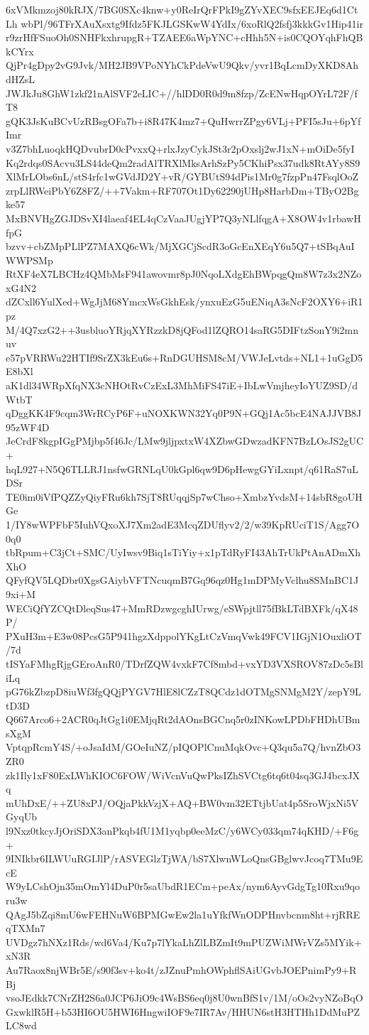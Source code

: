 6xVMkmzoj80kRJX/7BG0SXc4knw+y0ReIrQrFPkI9gZYvXEC9sfxEEJEq6d1CtLh
wbPl/96TFrXAuXsxtg9Ifdz5FKJLGSKwW4YdIx/6xoRlQ2fsfj3kkkGv1Hip41ir
r9zrHfFSuoOh0SNHFkxhrupgR+TZAEE6aWpYNC+cHhh5N+is0CQOYqhFhQBkCYrx
QjPr4gDpy2vG9Jvk/MH2JB9VPoNYhCkPdeVwU9Qkv/yvr1BqLcmDyXKD8AhdHZsL
JWJkJu8GhW1zkf21nAlSVF2eLIC+//hlDD0R0d9m8fzp/ZcENwHqpOYrL72F/fT8
gQK3JsKuBCvUzRBsgOFa7b+i8R47K4mz7+QuHwrrZPgy6VLj+PFI5sJu+6pYfImr
v3Z7bhLuoqkHQDvubrD0cPvxxQ+rlxJzyCykJSt3r2pOxslj2wJ1xN+mOiDe5fyI
Kq2rdqs0SAcvu3LS44deQm2radAlTRXlMksArhSzPy5CKhiPsx37udk8RtAYy8S9
XlMrLObs6nL/stS4rfc1wGVdJD2Y+vR/GYBUtS94dPis1Mr0g7fzpPn47FsqlOoZ
zrpLlRWeiPbY6Z8FZ/++7Vakm+RF707Ot1Dy62290jUHp8HarbDm+TByO2Bgke57
MxBNVHgZGJDSvXI4laeaf4EL4qCzVaaJUgjYP7Q3yNLlfqgA+X8OW4v1rbawHfpG
bzvv+cbZMpPLlPZ7MAXQ6cWk/MjXGCjScdR3oGcEnXEqY6u5Q7+tSBqAuIWWPSMp
RtXF4eX7LBCHz4QMbMsF941awovmr8pJ0NqoLXdgEhBWpqgQm8W7z3x2NZoxG4N2
dZCxll6YulXed+WgJjM68YmcxWsGkhEsk/ynxuEzG5uENiqA3sNcF2OXY6+iR1pz
M/4Q7xzG2++3usbluoYRjqXYRzzkD8jQFod1lZQRO14saRG5DIFtzSonY9i2mnuv
e57pVRRWu22HTIf9SrZX3kEu6s+RnDGUHSM8cM/VWJeLvtds+NL1+1uGgD5E8bXl
aK1dl34WRpXfqNX3cNHOtRvCzExL3MhMiFS47iE+IbLwVmjheyIoYUZ9SD/dWtbT
qDggKK4F9cqm3WrRCyP6F+uNOXKWN32Yq0P9N+GQj1Ac5bcE4NAJJVB8J95zWF4D
JeCrdF8kgpIGgPMjbp5f46Jc/LMw9jljpxtxW4XZbwGDwzadKFN7BzLOsJS2gUC+
hqL927+N5Q6TLLRJ1nsfwGRNLqU0kGpl6qw9D6pHewgGYiLxnpt/q61RaS7uLDSr
TE0im0iVfPQZZyQiyFRu6kh7SjT8RUqqjSp7wChso+XmbzYvdsM+14sbR8goUHGe
1/IY8wWPFbF5IuhVQxoXJ7Xm2adE3McqZDUflyv2/2/w39KpRUciT1S/Agg7O0q0
tbRpum+C3jCt+SMC/UyIwsv9Biq1sTiYiy+x1pTdRyFI43AhTrUkPtAnADmXhXhO
QFyfQV5LQDbr0XgsGAiybVFTNcuqmB7Gq96qz0Hg1mDPMyVclhu8SMnBC1J9xi+M
WECiQfYZCQtDleqSus47+MmRDzwgcghIUrwg/eSWpjtll75fBkLTdBXFk/qX48P/
PXuH3m+E3w08PcsG5P941hgzXdppolYKgLtCzVmqVwk49FCV1IGjN1OuxliOT/7d
tISYaFMhgRjgGEroAnR0/TDrfZQW4vxkF7Cf8mbd+vxYD3VXSROV87zDc5sBliLq
pG76kZbzpD8iuWf3fgQQjPYGV7HlE8lCZzT8QCdz1dOTMgSNMgM2Y/zepY9LtD3D
Q667Arco6+2ACR0qJtGg1i0EMjqRt2dAOnsBGCnq5r0zINKowLPDbFHDhUBmsXgM
VptqpRcmY4S/+oJsaIdM/GOeIuNZ/pIQOPlCnuMqkOvc+Q3qu5a7Q/hvnZbO3ZR0
zk1Ily1xF80ExLWhKIOC6FOW/WiVcnVuQwPksIZhSVCtg6tq6t04sq3GJ4bcxJXq
mUhDxE/++ZU8xPJ/OQjaPkkVzjX+AQ+BW0vm32ETtjbUat4p5SroWjxNi5VGyqUb
l9Nxz0tkcyJjOriSDX3anPkqb4fU1M1yqbp0eeMzC/y6WCy033qm74qKHD/+F6g+
9INIkbr6ILWUuRGIJlP/rASVEGlzTjWA/bS7XlwnWLoQnsGBglwvJcoq7TMu9EcE
W9yLCshOjn35mOmYl4DuP0r5saUbdR1ECm+peAx/nym6AyvGdgTg10Rxu9qoru3w
QAgJ5bZqi8mU6wFEHNuW6BPMGwEw2la1uYfkfWnODPHnvbcnm8ht+rjRREqTXMn7
UVDgz7hNXz1Rds/wd6Va4/Ku7p7lYkaLhZlLBZmIt9mPUZWiMWrVZs5MYik+xN3R
Au7Raox8njWBr5E/s90f3sv+ko4t/zJZnuPmhOWphflSAiUGvbJOEPnimPy9+RBj
vsoJEdkk7CNrZH2S6a0JCP6JiO9c4WsBS6eq0j8U0wnBfS1v/1M/oOs2vyNZoBqO
GxwklR5H+b53HI6OU5HWI6HngwiIOF9e7IR7Av/HHUN6stH3HTHh1DdMuPZLC8wd
